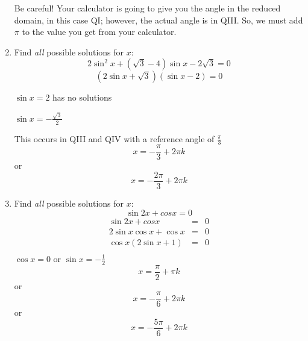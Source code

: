 \documentclass[letterpaper,12pt,fleqn]{article}
\begin{document}
\begin{enumerate}
  Be careful! Your calculator is going to give you the angle in the reduced
  domain, in this case QI; however, the actual angle is in QIII. So, we must
  add $\pi$ to the value you get from your calculator.

  \bigskip

  \item Find \emph{all} possible solutions for $x$:
    \[2\sin^2x+(\sqrt{3}-4)\sin{x}-2\sqrt{3}=0\]
    \[(2\sin{x}+\sqrt{3})(\sin{x}-2)=0\]

    $\sin{x}=2$ has no solutions

    $\sin{x}=-\frac{\sqrt{3}}{2}$

    This occurs in QIII and QIV with a reference angle of $\frac{\pi}{3}$
    \[x=-\frac{\pi}{3}+2\pi k\]
    or \\
    \[x=-\frac{2\pi}{3}+2\pi k\]

\item Find \emph{all} possible solutions for $x$:
  \[\sin{2x}+cos{x}=0\]
  \begin{eqnarray*}
    \sin{2x}+cos{x} &=& 0 \\
    2\sin{x}\cos{x}+\cos{x} &=& 0 \\
    \cos{x}(2\sin{x}+1) &=& 0 \\
  \end{eqnarray*}
  $\cos{x}=0$ or $\sin{x}=-\frac{1}{2}$
  \[x=\frac{\pi}{2}+\pi k\]
  or
  \[x=-\frac{\pi}{6}+2\pi k\]
  or
  \[x=-\frac{5\pi}{6}+2\pi k\]
\end{enumerate}
\end{document}
